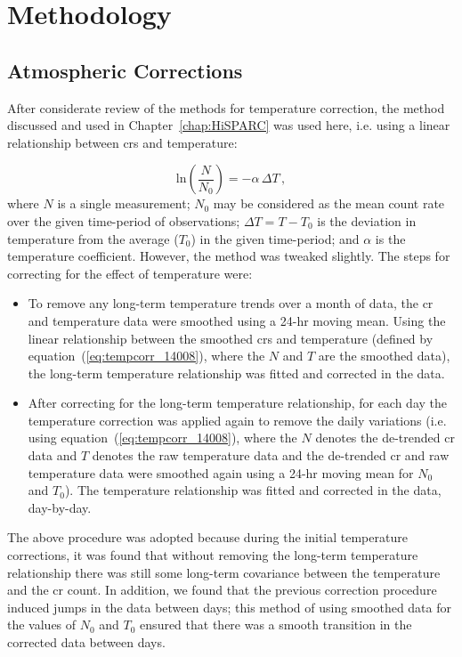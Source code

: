 \section{Methodology}\label{sec:HS_14008_methods}

\subsection{Atmospheric Corrections}

After considerate review of the methods for temperature correction, the method discussed and used in Chapter~\ref{chap:HiSPARC} was used here, i.e. using a linear relationship between \glspl{cr} and temperature:

\begin{equation}
\mathrm{ln} \left( \frac{N}{N_0} \right) = - \alpha \, \Delta T \, ,
\label{eq:tempcorr_14008}
\end{equation}
%
where $N$ is a single measurement; $N_0$ may be considered as the mean count rate over the given time-period of observations; $\Delta T = T - T_0$ is the deviation in temperature from the average ($T_0$) in the given time-period; and $\alpha$ is the temperature coefficient. However, the method was tweaked slightly. The steps for correcting for the effect of temperature were:

\begin{itemize}
	\item{To remove any long-term temperature trends over a month of data, the \gls{cr} and temperature data were smoothed using a 24-hr moving mean. Using the linear relationship between the smoothed \glspl{cr} and temperature (defined by equation~(\ref{eq:tempcorr_14008}), where the $N$ and $T$ are the smoothed data), the long-term temperature relationship was fitted and corrected in the data.}

	\item{After correcting for the long-term temperature relationship, for each day the temperature correction was applied again to remove the daily variations (i.e. using equation~(\ref{eq:tempcorr_14008}), where the $N$ denotes the de-trended \gls{cr} data and $T$ denotes the raw temperature data and the de-trended \gls{cr} and raw temperature data were smoothed again using a 24-hr moving mean for $N_0$ and $T_0$). The temperature relationship was fitted and corrected in the data, day-by-day.}
\end{itemize}


The above procedure was adopted because during the initial temperature corrections, it was found that without removing the long-term temperature relationship there was still some long-term covariance between the temperature and the \gls{cr} count. In addition, we found that the previous correction procedure induced jumps in the data between days; this method of using smoothed data for the values of $N_0$ and $T_0$ ensured that there was a smooth transition in the corrected data between days.

